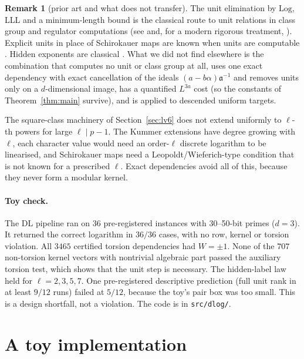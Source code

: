 \documentclass[11pt]{amsart}
\theoremstyle{definition}
\newtheorem{remark}[theorem]{Remark}
\begin{document}
\begin{remark}[prior art and what does not transfer]\label{rem:DLprior}
The unit elimination by $\mathrm{Log}$, LLL and a minimum-length bound is the classical route to unit relations in class group and
regulator computations (see \cite{cohen1993} and, for a modern rigorous treatment, \cite[Part~3]{dbpw2025}). Explicit units in place of
Schirokauer maps are known when units are computable \cite[Ex.~2.6]{schirokauer2008}. Hidden exponents are classical
\cite{pomerance1987,engegaudry2002}. What we did not find elsewhere is the combination that computes no unit or class group at all, uses one exact
dependency with exact cancellation of the ideals $(a-b\alpha)\mathfrak a^{-1}$ and removes units only on a $d$-dimensional image, has a quantified
$L^{3a}$ cost (so the constants of Theorem~\ref{thm:main} survive), and is applied to descended uniform targets.

The square-class machinery of Section~\ref{sec:lv6} does not extend uniformly to $\ell$-th powers for large $\ell\mid p-1$. The Kummer extensions
have degree growing with $\ell$, each character value would need an order-$\ell$ discrete logarithm to be linearised, and Schirokauer maps need a
Leopoldt/Wieferich-type condition that is not known for a prescribed $\ell$. Exact dependencies avoid all of this, because they never form a
modular kernel.
\end{remark}

\paragraph{Toy check.} The DL pipeline ran on 36 pre-registered instances with 30--50-bit primes ($d=3$). It returned the correct logarithm in
$36/36$ cases, with no row, kernel or torsion violation. All $3465$ certified torsion dependencies had $W=\pm1$. None of the $707$ non-torsion
kernel vectors with nontrivial algebraic part passed the auxiliary torsion test, which shows that the unit step is necessary. The hidden-label
law held for $\ell=2,3,5,7$. One pre-registered descriptive prediction (full unit rank in at least $9/12$ runs) failed at $5/12$, because the toy's
pair box was too small. This is a design shortfall, not a violation. The code is in \texttt{src/dlog/}.

\section{A toy implementation}\label{sec:toy}
\end{document}

